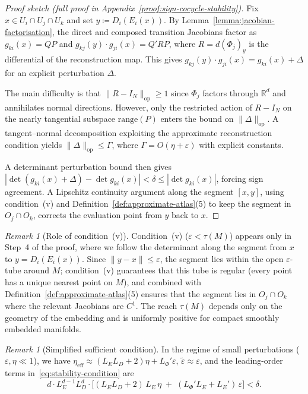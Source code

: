 \documentclass[11pt]{article}
\newcommand{\R}{\mathbb{R}}
\theoremstyle{plain}
\theoremstyle{definition}
\theoremstyle{remark}
\newtheorem{remark}[theorem]{Remark}
\begin{document}
\begin{proof}[Proof sketch (full proof in Appendix~\ref{proof:sign-cocycle-stability})]
Fix $x \in U_i \cap U_j \cap U_k$ and set $y \coloneqq D_i(E_i(x))$. By Lemma~\ref{lemma:jacobian-factorisation}, the direct and composed transition Jacobians factor as $g_{ki}(x) = QP$ and $g_{kj}(y) \cdot g_{ji}(x) = Q'RP$, where $R = d(\Phi_j)_y$ is the differential of the reconstruction map. This gives $g_{kj}(y) \cdot g_{ji}(x) = g_{ki}(x) + \Delta$ for an explicit perturbation $\Delta$.

The main difficulty is that $\|R - I_N\|_{\mathrm{op}} \geq 1$ since $\Phi_j$ factors through $\R^d$ and annihilates normal directions. However, only the restricted action of $R - I_N$ on the nearly tangential subspace $\mathrm{range}(P)$ enters the bound on $\|\Delta\|_{\mathrm{op}}$. A tangent--normal decomposition exploiting the approximate reconstruction condition yields $\|\Delta\|_{\mathrm{op}} \leq \Gamma$, where $\Gamma = O(\eta + \varepsilon)$ with explicit constants.

A determinant perturbation bound then gives $|\det(g_{ki}(x) + \Delta) - \det g_{ki}(x)| < \delta \leq |\det g_{ki}(x)|$, forcing sign agreement. A Lipschitz continuity argument along the segment $[x, y]$, using condition~(v) and Definition~\ref{def:approximate-atlas}(5) to keep the segment in $O_j \cap O_k$, corrects the evaluation point from $y$ back to $x$.
\end{proof}

\begin{remark}[Role of condition~(v)]\label{rem:reach-condition}
Condition~(v) ($\varepsilon < \tau(M)$) appears only in Step~4 of the proof, where we follow the determinant along the segment from $x$ to $y = D_i(E_i(x))$. Since $\|y - x\| \leq \varepsilon$, the segment lies within the open $\varepsilon$-tube around $M$; condition~(v) guarantees that this tube is regular (every point has a unique nearest point on $M$), and combined with Definition~\ref{def:approximate-atlas}(5) ensures that the segment lies in $O_j \cap O_k$ where the relevant Jacobians are $C^1$. The reach $\tau(M)$ depends only on the geometry of the embedding and is uniformly positive for compact smoothly embedded manifolds.
\end{remark}

\begin{remark}[Simplified sufficient condition]\label{rem:simplified-stability}
In the regime of small perturbations ($\varepsilon, \eta \ll 1$), we have $\eta_{\mathrm{eff}} \approx (L_E L_D + 2)\eta + L_\Phi'\varepsilon$, $\widetilde{\varepsilon} \approx \varepsilon$, and the leading-order terms in~\eqref{eq:stability-condition} are
\[
d \cdot L_E^{d-1} L_D^d \cdot \bigl[(L_E L_D + 2)\, L_E\, \eta \;+\; (L_\Phi' L_E + L_E')\,\varepsilon\bigr] < \delta.
\]
\end{remark}
\end{document}
